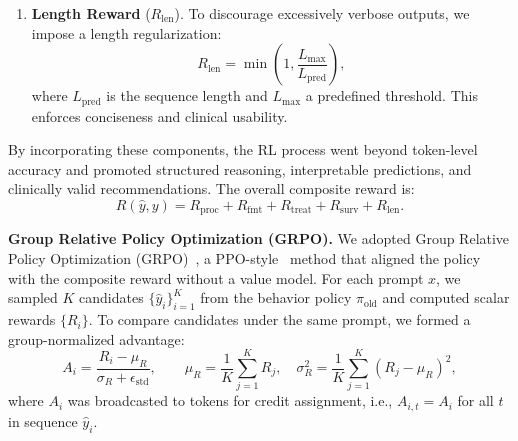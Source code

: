 \documentclass{article}
\begin{document}
\begin{enumerate}
    \item \textbf{Length Reward} ($R_{\text{len}}$).  
    To discourage excessively verbose outputs, we impose a length regularization:
    \begin{equation}
        R_{\text{len}} = \min\left(1, \frac{L_{\max}}{L_{\text{pred}}}\right),
    \end{equation}
    where $L_{\text{pred}}$ is the sequence length and $L_{\max}$ a predefined threshold. 
    This enforces conciseness and clinical usability.
    
\end{enumerate}

By incorporating these components, the RL process went beyond token-level accuracy and promoted structured reasoning, interpretable predictions, and clinically valid recommendations. The overall composite reward is: 
\begin{equation}
    R(\hat{y}, y) =  R_{\text{proc}} + R_{\text{fmt}} +  R_{\text{treat}} +  R_{\text{surv}} +  R_{\text{len}}.
\end{equation}


\textbf{Group Relative Policy Optimization (GRPO).}
We adopted Group Relative Policy Optimization (GRPO)~\cite{shao_deepseekmath_2024}, a PPO-style~\cite{schulman_ppo_2017} method that aligned the policy with the composite reward without a value model. For each prompt $x$, we sampled $K$ candidates $\{\hat y_i\}_{i=1}^{K}$ from the behavior policy $\pi_{\text{old}}$ and computed scalar rewards $\{R_i\}$. To compare candidates under the same prompt, we formed a group-normalized advantage:
\begin{equation}
A_i=\frac{R_i-\mu_R}{\sigma_R+\epsilon_{\text{std}}},\qquad
\mu_R=\frac{1}{K}\sum_{j=1}^{K}R_j,\quad
\sigma_R^2=\frac{1}{K}\sum_{j=1}^{K}(R_j-\mu_R)^2,
\label{eq:grpo-adv}
\end{equation}
where $A_i$ was broadcasted to tokens for credit assignment, i.e., $A_{i,t}\!=\!A_i$ for all $t$ in sequence $\hat y_i$.
\end{document}
